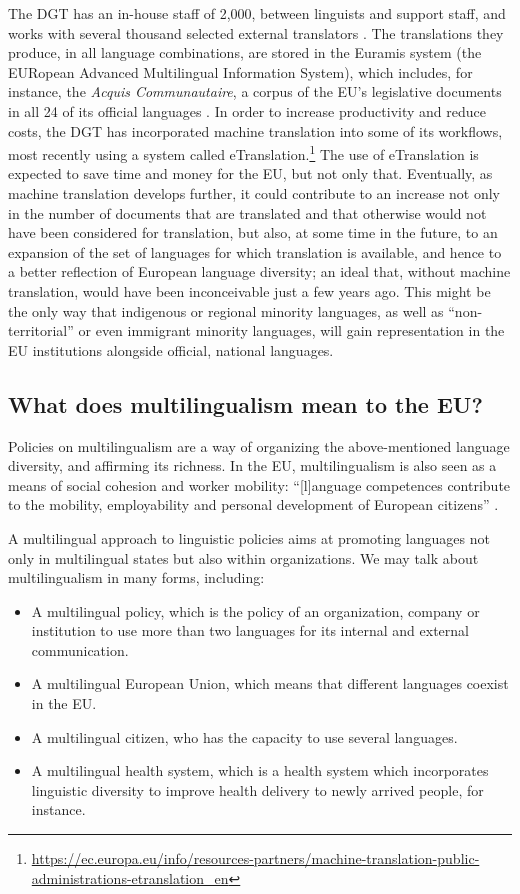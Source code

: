 \documentclass[output=paper]{langscibook}
\begin{document}
The DGT has an in-house staff of 2,000, between linguists and support staff, and works with several thousand selected external translators \citep{DGT2022}. The translations they produce, in all language combinations, are stored in the Euramis system (the EURopean Advanced Multilingual Information System), which includes, for instance, the \textit{Acquis Communautaire}, a corpus of the EU’s legislative documents in all 24 of its official languages \citep{JRC2022}. In order to increase productivity and reduce costs, the DGT has incorporated machine translation into some of its workflows, most recently using a system called eTranslation.\footnote{\url{https://ec.europa.eu/info/resources-partners/machine-translation-public-administrations-etranslation_en}} The use of eTranslation is expected to save time and money for the EU, but not only that. Eventually, as machine translation develops further, it could contribute to an increase not only in the number of documents that are translated and that otherwise would not have been considered for translation, but also, at some time in the future, to an expansion of the set of languages for which translation is available, and hence to a better reflection of European language diversity; an ideal that, without machine translation, would have been inconceivable just a few years ago. This might be the only way that indigenous or regional minority languages, as well as “non-territorial” or even immigrant minority languages, will gain representation in the EU institutions alongside official, national languages.

\subsection{What does multilingualism mean to the EU?}

Policies on multilingualism are a way of organizing the above-mentioned language diversity, and affirming its richness. In the EU, multilingualism is also seen as a means of social cohesion and worker mobility: “[l]anguage competences contribute to the mobility, employability and personal development of European citizens” \citep{CounciloftheEU2014}. 

A multilingual approach to linguistic policies aims at promoting languages not only in multilingual states but also within organizations. We may talk about multilingualism in many forms, including:

\begin{itemize}
\item  A multilingual policy, which is the policy of an organization, company or institution to use more than two languages for its internal and external communication.
\item A multilingual European Union, which means that different languages coexist in the EU.
\item A multilingual citizen, who has the capacity to use several languages.
\item A multilingual health system, which is a health system which incorporates linguistic diversity to improve health delivery to newly arrived people, for instance.
\end{itemize}
\end{document}
